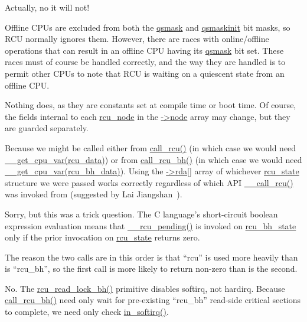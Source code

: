 	Actually, no it will not!

	Offline CPUs are excluded from both the \url{qsmask} and
	\url{qsmaskinit} bit masks, so RCU normally ignores them.
	However, there are races with online/offline operations that
	can result in an offline CPU having its \url{qsmask} bit set.
	These races must of course be handled correctly, and the way
	they are handled is to permit other CPUs to note that RCU
	is waiting on a quiescent state from an offline CPU.


	Nothing does, as they are constants set at compile time
	or boot time.
	Of course, the fields internal to each \url{rcu_node}
	in the \url{->node} array may change, but they are
	guarded separately.


	Because we might be called either from \url{call_rcu()}
	(in which case we would need \url{__get_cpu_var(rcu_data)})
	or from \url{call_rcu_bh()} (in which case we would need
	\url{__get_cpu_var(rcu_bh_data)}).
	Using the \url{->rda[]} array of whichever
	\url{rcu_state} structure we were passed works correctly
	regardless of which API \url{__call_rcu()} was invoked from
	(suggested by Lai Jiangshan~\cite{LaiJiangshan2008NewClassicAlgorithm}).


	Sorry, but this was a trick question.
	The C language's short-circuit boolean expression evaluation
	means that \url{__rcu_pending()} is invoked on
	\url{rcu_bh_state} only if the prior invocation on
	\url{rcu_state} returns zero.

	The reason the two calls are in this order is that
	``rcu'' is used more heavily than is ``rcu\_bh'', so
	the first call is more likely to return non-zero than
	is the second.


	No.
	The \url{rcu_read_lock_bh()} primitive disables
	softirq, not hardirq.
	Because \url{call_rcu_bh()} need only wait for pre-existing
	``rcu\_bh'' read-side critical sections to complete,
	we need only check \url{in_softirq()}.

